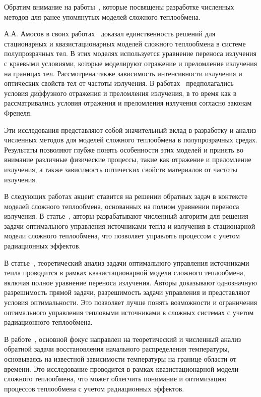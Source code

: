 Обратим внимание на работы~\cite{
    asllanaj2004convergence, asllanaj2007transient, banoczi1999fast,
    ghattassi2016galerkin, klein2005transient, kovtanyuk2012,
}, которые посвящены разработке численных методов для ранее упомянутых моделей сложного теплообмена.

А.А. Амосов в своих работах~\cite{
    Amosov2016, Amosov2017, amosov2016unique, amosov2017unique,
} доказал единственность решений для стационарных и квазистационарных
моделей сложного теплообмена в системе полупрозрачных тел.
В этих моделях используется уравнение переноса излучения с краевыми условиями,
которые моделируют отражение и преломление излучения на границах тел.
Рассмотрена также зависимость интенсивности излучения и оптических свойств
тел от частоты излучения.
В работах~\cite{
    Amosov2016, Amosov2017,
} предполагались условия диффузного отражения и преломления излучения,
в то время как в~\cite{amosov2016unique, amosov2017unique} рассматривались условия
отражения и преломления излучения согласно законам Френеля.

Эти исследования представляют собой значительный вклад в разработку и анализ
численных методов для моделей сложного теплообмена в полупрозрачных средах.
Результаты позволяют глубже понять особенности этих моделей и принять во внимание
различные физические процессы, такие как отражение и преломление излучения,
а также зависимость оптических свойств материалов от частоты излучения.

В следующих работах акцент ставится на решении обратных задач в
контексте моделей сложного теплообмена, основанных на полном уравнении переноса излучения.
В статье~\cite{end2010optimization}, авторы разрабатывают численный алгоритм для решения
задачи оптимального управления источниками тепла и излучения в стационарной модели сложного
теплообмена, что позволяет управлять процессом с учетом радиационных эффектов.

В статье~\cite{end2011analytical}, теоретический анализ задачи оптимального
управления источниками тепла проводится в рамках квазистационарной модели сложного теплообмена,
включая полное уравнение переноса излучения.
Авторы доказывают однозначную разрешимость прямой задачи,
разрешимость задачи управления и представляют условия оптимальности.
Это позволяет лучше понять возможности и ограничения оптимального управления тепловыми
источниками в сложных системах с учетом радиационного теплообмена.

В работе~\cite{amosov2010stationary}, основной фокус направлен на теоретический
и численный анализ обратной задачи восстановления начального распределения температуры,
основываясь на известной зависимости температуры на границе области от времени.
Это исследование проводится в рамках квазистационарной модели сложного теплообмена,
что может облегчить понимание и оптимизацию процессов теплообмена с учетом радиационных эффектов.



